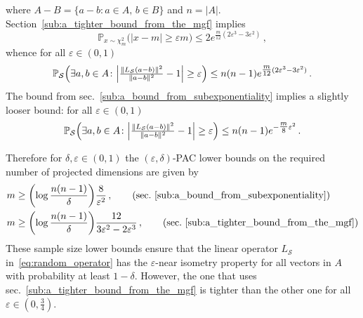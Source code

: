 \documentclass[a4paper,10pt]{article}
\begin{document}
where $A - B = \{a - b\colon a\in A,\,b\in B\}$ and $n = \lvert A \rvert$.
Section~\ref{sub:a_tighter_bound_from_the_mgf} implies
\begin{equation*}
  \mathbb{P}_{x \sim \chi^2_m} \bigl(
      \lvert x - m \rvert \geq \varepsilon m
    \bigr)
    \leq 2 e^{\tfrac{m}{12} (2 \varepsilon^3 - 3 \varepsilon^2)}
    \,,
\end{equation*}
whence for all $\varepsilon \in (0, 1)$
\begin{equation*}
  \mathbb{P}_\mathcal{S}\Bigl(
      \exists{a, b\in A} \colon
      \Bigl\lvert \tfrac{\| L_\mathcal{S} (a - b) \|^2}{\|a - b\|^2} - 1 \Bigr\rvert
        \geq \varepsilon
    \Bigr)
    \leq n (n - 1) e^{\tfrac{m}{12} (2 \varepsilon^3 - 3 \varepsilon^2)}
    \,.
\end{equation*}
The bound from sec.~\ref{sub:a_bound_from_subexponentiality} implies a slightly
looser bound: for all $\varepsilon \in (0, 1)$
\begin{equation*}
  \mathbb{P}_\mathcal{S}\Bigl(
      \exists{a, b\in A} \colon
      \Bigl\lvert \tfrac{\| L_\mathcal{S} (a - b) \|^2}{\|a - b\|^2} - 1 \Bigr\rvert
        \geq \varepsilon
    \Bigr)
    \leq n (n - 1) e^{- \tfrac{m}{8} \varepsilon^2}
    \,.
\end{equation*}

Therefore for $\delta, \varepsilon \in (0, 1)$ the $(\varepsilon, \delta)$-PAC
lower bounds on the required number of projected dimensions are given by
\begin{align*}
  m &\geq
      \biggl( \log\frac{n (n-1)}{\delta} \biggr)
      \frac{8}{\varepsilon^2}
    \,, \tag{sec.~\ref{sub:a_bound_from_subexponentiality}}
    \\
  m &\geq
      \biggl( \log\frac{n (n-1)}{\delta} \biggr)
      \frac{12}{3 \varepsilon^2 - 2 \varepsilon^3}
    \,, \tag{sec.~\ref{sub:a_tighter_bound_from_the_mgf}}
\end{align*}
These sample size lower bounds ensure that the linear operator $L_\mathcal{S}$
in~\eqref{eq:random_operator} has the $\varepsilon$-near isometry property for all
vectors in $A$ with probability at least $1 - \delta$. However, the one that uses
sec.~\ref{sub:a_tighter_bound_from_the_mgf} is tighter than the other one for all
$\varepsilon \in (0, \tfrac34)$.
\end{document}
